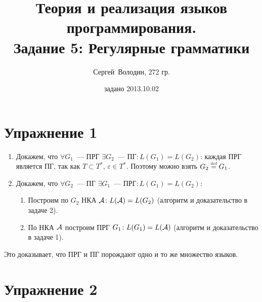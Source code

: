 \documentclass[a4paper]{article}
\title{Теория и реализация языков программирования.\\Задание 5: Регулярные грамматики}
\date{задано 2013.10.02}
\author{Сергей~Володин, 272 гр.}
\def\A{{\cal A}}
\def\eqdef{\overset{\mbox{\tiny def}}{=}}
\begin{document}
\maketitle
\section*{Упражнение 1}
\begin{enumerate}
\item Докажем, что $\forall G_1$~--- ПРГ $\exists G_2$~--- ПГ$\colon L(G_1)=L(G_2)$: каждая ПРГ является ПГ, так как $T\subset T^*$, $\varepsilon\in T^*$. Поэтому можно взять $G_2\eqdef G_1$.
\item Докажем, что $\forall G_2$~--- ПГ $\exists G_1$~--- ПРГ$\colon L(G_1)=L(G_2)$:\begin{enumerate}[1.]
\item Построим по $G_2$ НКА $\A\colon L(\A)=L(G_2)$ (алгоритм и доказательство в задаче 2).
\item По НКА $\A$ построим ПРГ $G_1\colon L(G_1)=L(\A)$ (алгоритм и доказательство в задаче 1).
\end{enumerate}
\end{enumerate}
Это доказывает, что ПРГ и ПГ порождают одно и то же множество языков.
\section*{Упражнение 2}
\end{document}
